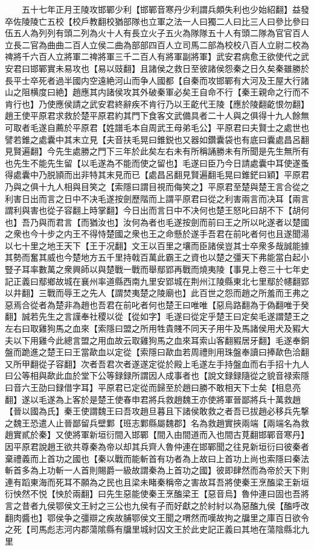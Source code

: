 　　五十七年正月王陵攻邯鄲少利【邯鄲音寒丹少利謂兵頗失利也少始紹翻】益發卒佐陵陵亡五校【校戶教翻校猶部隊也立軍之法一人曰獨二人曰比三人曰參比參曰伍五人為列列有頭二列為火十人有長立火子五火為隊隊五十人有頭二隊為官官百人立長二官為曲曲二百人立侯二曲為部部四百人立司馬二部為校校八百人立尉二校為禆將千六百人立將軍二禆將軍三千二百人有將軍副將軍】武安君病愈王欲使代之武安君曰邯鄲實未易攻也【易以豉翻】且諸侯之救日至彼諸侯怨秦之日久矣秦雖勝於長平士卒死者過半國内空遠絶河山而争人國都【自秦而攻邯鄲有大河及王屋大行諸山之阻横度曰絶】趙應其内諸侯攻其外破秦軍必矣王自命不行【秦王親命之行而不肯行也】乃使應侯請之武安君終辭疾不肯行乃以王齕代王陵【應於陵翻齕恨勿翻】趙王使平原君求救於楚平原君約其門下食客文武備具者二十人與之俱得十九人餘無可取者毛遂自薦於平原君【姓譜毛本自周武王母弟毛公】平原君曰夫賢士之處世也譬若錐之處囊中其末立見【夫音扶毛晃曰錐鋭也又器如鑽囊袋也有底曰囊處昌呂翻見賢遍翻】今先生處勝之門下三年於此矣左右未有所稱誦勝未有所聞是先生無所有也先生不能先生留【以毛遂為不能而使之留也】毛遂曰臣乃今日請處囊中耳使遂蚤得處囊中乃脱頴而出非特其末見而已【處昌呂翻見賢遍翻毛晃曰錐鋩曰穎】平原君乃與之俱十九人相與目笑之【索隱曰謂目視而侮笑之】平原君至楚與楚王言合從之利害日出而言之日中不决毛遂按劍歷階而上謂平原君曰從之利害兩言而决耳【兩言謂利與害也從子容翻上時掌翻】今日出而言日中不决何也楚王怒叱曰胡不下【胡何也】吾乃與而君言【而猶汝也】汝何為者也毛遂按劍而前曰王之所以叱遂者以楚國之衆也今十步之内王不得恃楚國之衆也王之命懸於遂手吾君在前叱者何也且遂聞湯以七十里之地王天下【王于况翻】文王以百里之壤而臣諸侯豈其士卒衆多哉誠能據其勢而奮其威也今楚地方五千里持戟百萬此霸王之資也以楚之彊天下弗能當白起小豎子耳率數萬之衆興師以與楚戰一戰而舉鄢郢再戰而燒夷陵【事見上卷三十七年史記正義曰鄢鄉故城在襄州率道縣西南九里安郢城在荆州江陵縣東北七里鄢於幰翻郢以井翻】三戰而辱王之先人【謂焚夷楚之陵廟也】此百世之怨而趙之所羞而王弗之惡焉合從者為楚非為趙也吾君在前叱者何也楚王曰唯唯【惡烏路翻為于偽翻唯于癸翻】誠若先生之言謹奉社稷以從【從如字】毛遂曰從定乎楚王曰定矣毛遂謂楚王之左右曰取雞狗馬之血來【索隱曰盟之所用牲貴賤不同天子用牛及馬諸侯用犬及豭大夫以下用雞今此總言盟之用血故云取雞狗馬之血來耳索山客翻豭居牙翻】毛遂奉銅盤而跪進之楚王曰王當歃血以定從【索隱曰歃血若周禮則用珠盤奉讀曰捧歃色洽翻又所甲翻從子容翻】次者吾君次者遂遂定從於殿上毛遂左手持盤血而右手招十九人曰公等相與歃此血於堂下公等録録所謂因人成事者也【說文録録隨從之貌音禄索隱曰音六王劭曰録借字耳】平原君已定從而歸至於趙曰勝不敢相天下士矣【相息亮翻】遂以毛遂為上客於是楚王使春申君將兵救趙魏王亦使將軍晉鄙將兵十萬救趙【晉以國為氏】秦王使謂魏王曰吾攻趙旦暮且下諸侯敢救之者吾已拔趙必移兵先撃之魏王恐遣人止晉鄙留兵壁鄴【班志鄴縣屬魏郡】名為救趙實挾兩端【兩端名為救趙實貳於秦】又使將軍新垣衍間入邯鄲【間入由間道而入也間古莧翻邯鄲音寒丹】因平原君說趙王欲共尊秦為帝以却其兵齊人魯仲連在邯鄲聞之往見新垣衍曰彼秦者棄禮義而上首功之國也【秦以戰而能斬首有功者為上故曰上首功上尚也索隱曰秦法斬首多為上功斬一人首則賜爵一級故謂秦為上首功之國】彼即肆然而為帝於天下則連有蹈東海而死耳不願為之民也且梁未睹秦稱帝之害故耳吾將使秦王烹醢梁王新垣衍怏然不悦【怏於兩翻】曰先生惡能使秦王烹醢梁王【惡音烏】魯仲連曰固也吾將言之昔者九侯鄂侯文王紂之三公也九侯有子而好獻之於紂紂以為惡醢九侯【醢呼改翻肉醬也】鄂侯争之彊辯之疾故脯鄂侯文王聞之喟然而嘆故拘之牖里之庫百日欲令之死【司馬彪志河内郡蕩隂縣有牖里城紂囚文王於此史記正義曰其地在蕩陰縣北九里